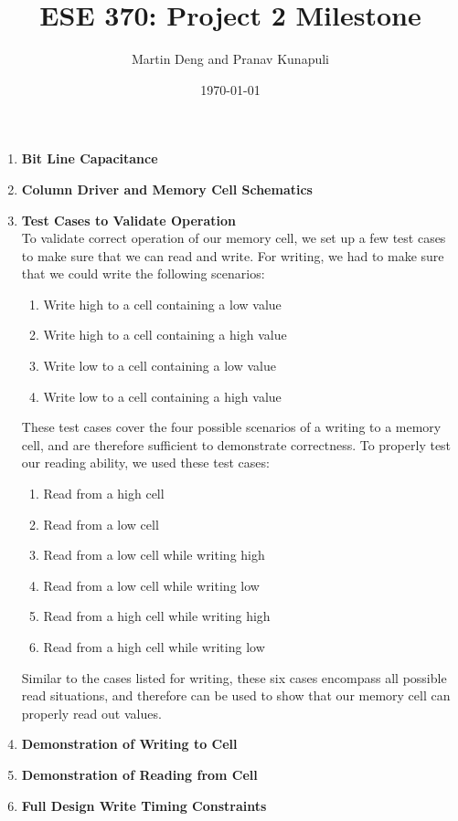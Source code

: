 \documentclass[11pt]{article}
\title{ESE 370: Project 2 Milestone}
\author{Martin Deng and Pranav Kunapuli}
\date{\today}
\theoremstyle{definition}
\begin{document}
\begin{enumerate}

\item \textbf{Bit Line Capacitance} \\

\item \textbf{Column Driver and Memory Cell Schematics} \\

\item \textbf{Test Cases to Validate Operation} \\
To validate correct operation of our memory cell, we set up a few test cases to make sure that we can read and write. For writing, we had to make sure that we could write the following scenarios:

\begin{enumerate}

\item Write high to a cell containing a low value
\item Write high to a cell containing a high value
\item Write low to a cell containing a low value
\item Write low to a cell containing a high value

\end{enumerate}

These test cases cover the four possible scenarios of a writing to a memory cell, and are therefore sufficient to demonstrate correctness. To properly test our reading ability, we used these test cases:

\begin{enumerate}

\item Read from a high cell
\item Read from a low cell
\item Read from a low cell while writing high
\item Read from a low cell while writing low
\item Read from a high cell while writing high
\item Read from a high cell while writing low

\end{enumerate}

Similar to the cases listed for writing, these six cases encompass all possible read situations, and therefore can be used to show that our memory cell can properly read out values.

\item \textbf{Demonstration of Writing to Cell} \\

\item \textbf{Demonstration of Reading from Cell} \\

\item \textbf{Full Design Write Timing Constraints}\\

\end{enumerate}
\end{document}
